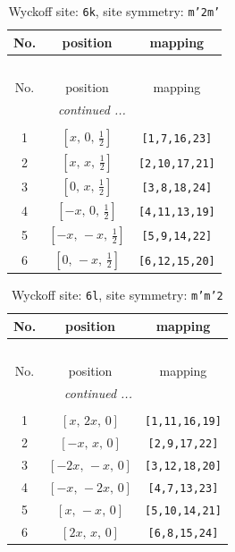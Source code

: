\documentclass[fleqn,8pt]{jsarticle}
\begin{document}
\renewcommand{\arraystretch}{1.2}
\begin{longtable}{ccc}
\caption{Wyckoff site: {\tt 6k}, site symmetry: {\tt m'2m'}}
 \\
 \hline \hline
No. & position & mapping \\ \hline \endfirsthead

\multicolumn{2}{l}{\tablename\ \thetable{}} \\
 \hline \hline
No. & position & mapping \\ \hline \endhead

 \hline \hline
\multicolumn{2}{r}{\footnotesize\it continued ...} \\ \endfoot

 \hline \hline
\multicolumn{2}{r}{} \\ \endlastfoot

1 & $\left[ x,\, 0,\, \frac{1}{2} \right]$ & {\tt [1,7,16,23]} \\ \hline
2 & $\left[ x,\, x,\, \frac{1}{2} \right]$ & {\tt [2,10,17,21]} \\ \hline
3 & $\left[ 0,\, x,\, \frac{1}{2} \right]$ & {\tt [3,8,18,24]} \\ \hline
4 & $\left[ - x,\, 0,\, \frac{1}{2} \right]$ & {\tt [4,11,13,19]} \\ \hline
5 & $\left[ - x,\, - x,\, \frac{1}{2} \right]$ & {\tt [5,9,14,22]} \\ \hline
6 & $\left[ 0,\, - x,\, \frac{1}{2} \right]$ & {\tt [6,12,15,20]} \\
\end{longtable}
\renewcommand{\arraystretch}{1.2}
\begin{longtable}{ccc}
\caption{Wyckoff site: {\tt 6l}, site symmetry: {\tt m'm'2}}
 \\
 \hline \hline
No. & position & mapping \\ \hline \endfirsthead

\multicolumn{2}{l}{\tablename\ \thetable{}} \\
 \hline \hline
No. & position & mapping \\ \hline \endhead

 \hline \hline
\multicolumn{2}{r}{\footnotesize\it continued ...} \\ \endfoot

 \hline \hline
\multicolumn{2}{r}{} \\ \endlastfoot

1 & $\left[ x,\, 2 x,\, 0 \right]$ & {\tt [1,11,16,19]} \\ \hline
2 & $\left[ - x,\, x,\, 0 \right]$ & {\tt [2,9,17,22]} \\ \hline
3 & $\left[ - 2 x,\, - x,\, 0 \right]$ & {\tt [3,12,18,20]} \\ \hline
4 & $\left[ - x,\, - 2 x,\, 0 \right]$ & {\tt [4,7,13,23]} \\ \hline
5 & $\left[ x,\, - x,\, 0 \right]$ & {\tt [5,10,14,21]} \\ \hline
6 & $\left[ 2 x,\, x,\, 0 \right]$ & {\tt [6,8,15,24]} \\
\end{longtable}
\end{document}

